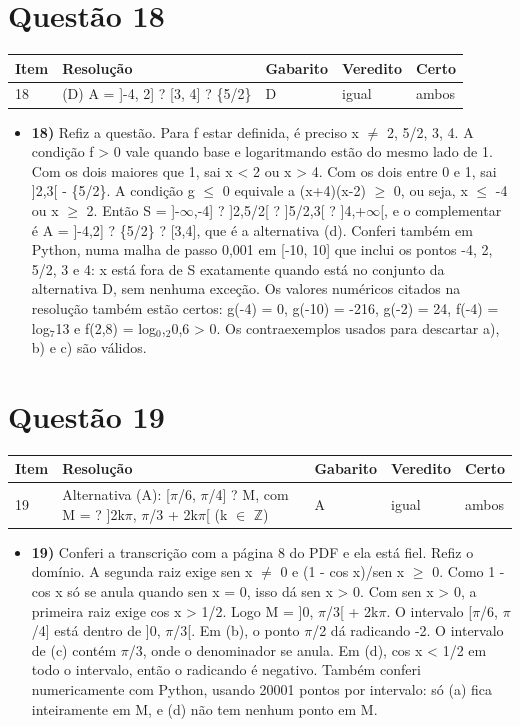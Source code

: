 \documentclass{article}%
\begin{document}
\section*{Questão 18}%
\begin{longtable}{@{}p{} p{} p{} p{} p{}@{}}\toprule Item & Resolução & Gabarito & Veredito & Certo \\ \midrule
18 & (D) A = {]}{-}4, 2{]} ? {[}3, 4{]} ? \{5/2\} & D & igual & ambos \\
\bottomrule\end{longtable}%
\begin{itemize}%
\item%
\textbf{18)} Refiz a questão. Para f estar definida, é preciso x $\neq$ 2, 5/2, 3, 4. A condição f > 0 vale quando base e logaritmando estão do mesmo lado de 1. Com os dois maiores que 1, sai x < 2 ou x > 4. Com os dois entre 0 e 1, sai {]}2,3{[} - \{5/2\}. A condição g $\leq$ 0 equivale a (x+4)(x-2) $\geq$ 0, ou seja, x $\leq$ -4 ou x $\geq$ 2. Então S = {]}-$\infty$,-4{]} ? {]}2,5/2{[} ? {]}5/2,3{[} ? {]}4,+$\infty${[}, e o complementar é A = {]}-4,2{]} ? \{5/2\} ? {[}3,4{]}, que é a alternativa (d). Conferi também em Python, numa malha de passo 0,001 em {[}-10, 10{]} que inclui os pontos -4, 2, 5/2, 3 e 4: x está fora de S exatamente quando está no conjunto da alternativa D, sem nenhuma exceção. Os valores numéricos citados na resolução também estão certos: g(-4) = 0, g(-10) = -216, g(-2) = 24, f(-4) = log$_{7}$13 e f(2,8) = log$_{0}$,$_{2}$0,6 > 0. Os contraexemplos usados para descartar a), b) e c) são válidos.%
\end{itemize}%
\section*{Questão 19}%
\begin{longtable}{@{}p{} p{} p{} p{} p{}@{}}\toprule Item & Resolução & Gabarito & Veredito & Certo \\ \midrule
19 & Alternativa (A): {[}$\pi$/6, $\pi$/4{]} ? M, com M = ? {]}2k$\pi$, $\pi$/3 + 2k$\pi${[} (k $\in$ $\mathbb{Z}$) & A & igual & ambos \\
\bottomrule\end{longtable}%
\begin{itemize}%
\item%
\textbf{19)} Conferi a transcrição com a página 8 do PDF e ela está fiel. Refiz o domínio. A segunda raiz exige sen x $\neq$ 0 e (1 - cos x)/sen x $\geq$ 0. Como 1 - cos x só se anula quando sen x = 0, isso dá sen x > 0. Com sen x > 0, a primeira raiz exige cos x > 1/2. Logo M = {]}0, $\pi$/3{[} + 2k$\pi$. O intervalo {[}$\pi$/6, $\pi$/4{]} está dentro de {]}0, $\pi$/3{[}. Em (b), o ponto $\pi$/2 dá radicando -2. O intervalo de (c) contém $\pi$/3, onde o denominador se anula. Em (d), cos x < 1/2 em todo o intervalo, então o radicando é negativo. Também conferi numericamente com Python, usando 20001 pontos por intervalo: só (a) fica inteiramente em M, e (d) não tem nenhum ponto em M.%
\end{itemize}%
\end{document}
